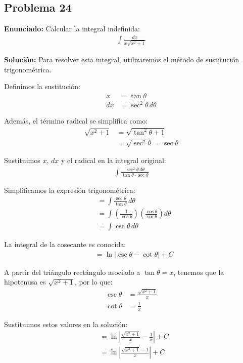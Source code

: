 \subsection*{Problema 24}

\textbf{Enunciado:}
Calcular la integral indefinida:
\begin{align*}
\int \frac{dx}{x \sqrt{x^2 + 1}}
\end{align*}

\textbf{Solución:}
Para resolver esta integral, utilizaremos el método de sustitución trigonométrica. 

Definimos la sustitución:
\begin{align*}
x &= \tan\theta \\
dx &= \sec^2\theta \, d\theta
\end{align*}

Además, el término radical se simplifica como:
\begin{align*}
\sqrt{x^2 + 1} &= \sqrt{\tan^2\theta + 1} \\
&= \sqrt{\sec^2\theta} = \sec\theta
\end{align*}

Sustituimos $x$, $dx$ y el radical en la integral original:
\begin{align*}
\int \frac{\sec^2\theta \, d\theta}{\tan\theta \cdot \sec\theta}
\end{align*}

Simplificamos la expresión trigonométrica:
\begin{align*}
&= \int \frac{\sec\theta}{\tan\theta} \, d\theta \\
&= \int \left(\frac{1}{\cos\theta}\right) \left(\frac{\cos\theta}{\sin\theta}\right) d\theta \\
&= \int \csc\theta \, d\theta
\end{align*}

La integral de la cosecante es conocida:
\begin{align*}
&= \ln \left| \csc\theta - \cot\theta \right| + C
\end{align*}

A partir del triángulo rectángulo asociado a $\tan\theta = x$, tenemos que la hipotenusa es $\sqrt{x^2+1}$, por lo que:
\begin{align*}
\csc\theta &= \frac{\sqrt{x^2 + 1}}{x} \\
\cot\theta &= \frac{1}{x}
\end{align*}

Sustituimos estos valores en la solución:
\begin{align*}
&= \ln \left| \frac{\sqrt{x^2+1}}{x} - \frac{1}{x} \right| + C \\
&= \ln \left| \frac{\sqrt{x^2+1} - 1}{x} \right| + C
\end{align*}

